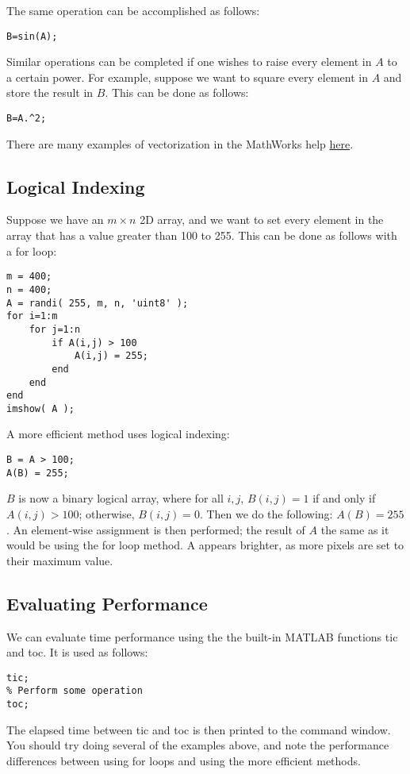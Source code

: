 \documentclass{article}
\begin{document}
The same operation can be accomplished as follows:
\begin{lstlisting}[style=Matlab-editor]
B=sin(A);
\end{lstlisting}
Similar operations can be completed if one wishes to raise every element in $A$ to a certain power. For example, suppose we want to square every element in $A$ and store the result in $B$. This can be done as follows:
\begin{lstlisting}[style=Matlab-editor]
B=A.^2;
\end{lstlisting}
There are many examples of vectorization in the MathWorks help \href{https://www.mathworks.com/help/matlab/matlab_prog/vectorization.html}{here}.

\subsection{Logical Indexing}

Suppose we have an $m \times n$ 2D array, and we want to set every element in the array that has a value greater than 100 to 255. This can be done as follows with a for loop:
\begin{lstlisting}[style=Matlab-editor]
m = 400;
n = 400;
A = randi( 255, m, n, 'uint8' );
for i=1:m
    for j=1:n
        if A(i,j) > 100
            A(i,j) = 255;
        end
    end
end
imshow( A );
\end{lstlisting}
A more efficient method uses logical indexing:
\begin{lstlisting}[style=Matlab-editor]
B = A > 100;
A(B) = 255;
\end{lstlisting}
$B$ is now a binary logical array, where for all $i,j$, $B(i,j)=1$ if and only if $A(i,j) > 100$; otherwise, $B(i,j)=0$. Then we do the following: $A(B) = 255$. An element-wise assignment is then performed; the result of $A$ the same as it would be using the for loop method. A appears brighter, as more pixels are set to their maximum value.

\subsection{Evaluating Performance}

We can evaluate time performance using the the built-in MATLAB functions tic and toc. It is used as follows:
\begin{lstlisting}[style=Matlab-editor]
tic;
% Perform some operation
toc;
\end{lstlisting}
The elapsed time between tic and toc is then printed to the command window. You should try doing several of the examples above, and note the performance differences between using for loops and using the more efficient methods.
\end{document}
